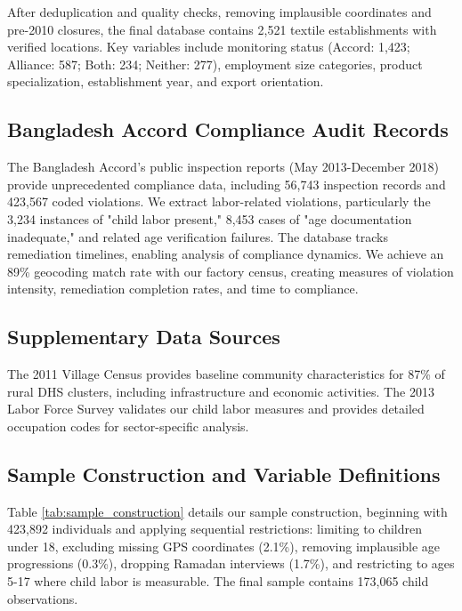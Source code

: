 \documentclass[12pt]{article}
\begin{document}
After deduplication and quality checks, removing implausible coordinates and pre-2010 closures, the final database contains 2,521 textile establishments with verified locations. Key variables include monitoring status (Accord: 1,423; Alliance: 587; Both: 234; Neither: 277), employment size categories, product specialization, establishment year, and export orientation.

\subsection{Bangladesh Accord Compliance Audit Records}

The Bangladesh Accord's public inspection reports (May 2013-December 2018) provide unprecedented compliance data, including 56,743 inspection records and 423,567 coded violations. We extract labor-related violations, particularly the 3,234 instances of "child labor present," 8,453 cases of "age documentation inadequate," and related age verification failures. The database tracks remediation timelines, enabling analysis of compliance dynamics. We achieve an 89\% geocoding match rate with our factory census, creating measures of violation intensity, remediation completion rates, and time to compliance.

\subsection{Supplementary Data Sources}

The 2011 Village Census provides baseline community characteristics for 87\% of rural DHS clusters, including infrastructure and economic activities. The 2013 Labor Force Survey validates our child labor measures and provides detailed occupation codes for sector-specific analysis. 

\subsection{Sample Construction and Variable Definitions}

Table \ref{tab:sample_construction} details our sample construction, beginning with 423,892 individuals and applying sequential restrictions: limiting to children under 18, excluding missing GPS coordinates (2.1\%), removing implausible age progressions (0.3\%), dropping Ramadan interviews (1.7\%), and restricting to ages 5-17 where child labor is measurable. The final sample contains 173,065 child observations.
\end{document}
